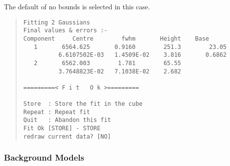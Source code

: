The default of no bounds is selected in this case.
\begin{quote}\begin{verbatim}
Fitting 2 Gaussians
Final values & errors :-
Component     Centre        fwhm       Height    Base
   1       6564.625       0.9160        251.3        23.05
          6.6107502E-03   1.4509E-02    3.816       0.6862
   2       6562.003        1.781        65.55
          3.7648823E-02   7.1038E-02    2.682
 
=========< F i t   O k >=========
 
Store  : Store the fit in the cube
Repeat : Repeat fit
Quit   : Abandon this fit
Fit Ok [STORE] - STORE
redraw current data? [NO]
\end{verbatim}\end{quote}

\subsubsection{Background Models}

